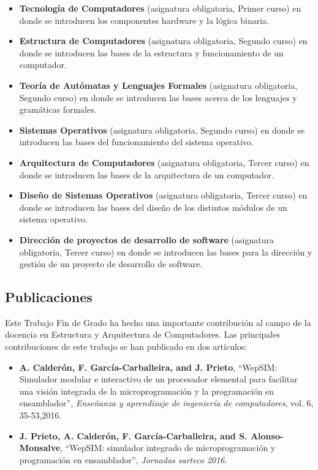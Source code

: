 \begin{itemize}

\item \textbf{Tecnología de Computadores} (asignatura obligatoria, Primer curso) en donde se introducen los componentes hardware y la lógica binaria.

\item \textbf{Estructura de Computadores} (asignatura obligatoria, Segundo curso) en donde se introducen las bases de la estructura y funcionamiento de un computador.

\item \textbf{Teoría de Autómatas y Lenguajes Formales} (asignatura obligatoria, Segundo curso) en donde se introducen las bases acerca de los lenguajes y gramáticas formales.

\item \textbf{Sistemas Operativos} (asignatura obligatoria, Segundo curso) en donde se introducen las bases del funcionamiento del sistema operativo.

\item \textbf{Arquitectura de Computadores} (asignatura obligatoria, Tercer curso) en donde se introducen las bases de la arquitectura de un computador.

\item \textbf{Diseño de Sistemas Operativos} (asignatura obligatoria, Tercer curso) en donde se introducen las bases del diseño de los distintos módulos de un sistema operativo.

\item \textbf{Dirección de proyectos de desarrollo de software} (asignatura obligatoria, Tercer curso) en donde se introducen las bases para la dirección y gestión de un proyecto de desarrollo de software.

\end{itemize}

\subsection{Publicaciones}

Este Trabajo Fin de Grado ha hecho una importante contribución al campo de la docencia en Estructura y Arquitectura de Computadores. Las principales contribuciones de este trabajo se han publicado en dos artículos:

\begin{itemize}

\item \textbf{A. Calderón, F. García-Carballeira, and J. Prieto}, “WepSIM: Simulador modular e interactivo de un procesador elemental para facilitar una visión integrada de la microprogramación y la programación en ensamblador”, \textit{Enseñanza y aprendizaje de ingeniería de computadores}, vol. 6, 35-53,2016. \cite{mateos2016wepsim}

\item \textbf{J. Prieto, A. Calderón, F. García-Carballeira, and S. Alonso-Monsalve}, “WepSIM: simulador integrado de microprogramación y programación en ensamblador”, \textit{Jornadas sarteco 2016}. \cite{arcos2032}

\end{itemize}

